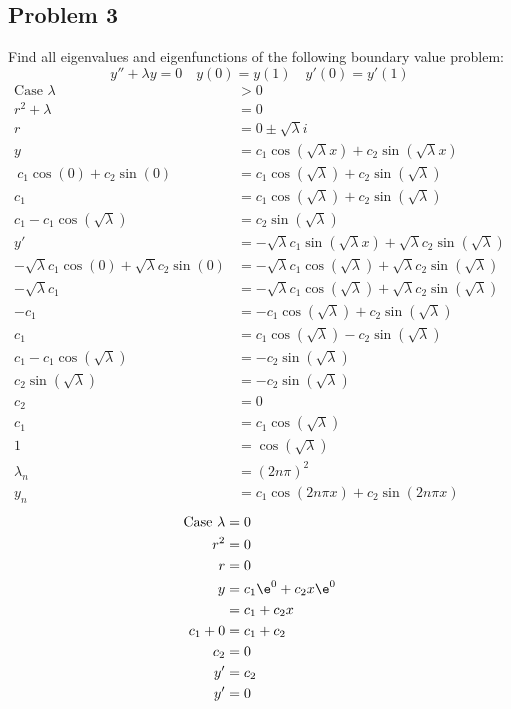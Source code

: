 \documentclass{math}
\begin{document}
\subsection*{Problem 3}
Find all eigenvalues and eigenfunctions of the following boundary value problem:
\[ y''+\lambda y = 0 \quad y(0) = y(1) \quad y'(0) = y'(1) \]
\begin{align*}
  \text{Case }\lambda &> 0 \\
  r^2+\lambda &= 0 \\
  r &= 0\pm\sqrt{\lambda}i \\
  y &= c_1\cos(\sqrt{\lambda}x)+c_2\sin(\sqrt{\lambda}x) \\\
  c_1\cos(0)+c_2\sin(0) &= c_1\cos(\sqrt{\lambda})+c_2\sin(\sqrt{\lambda}) \\
  c_1 &= c_1\cos(\sqrt{\lambda})+c_2\sin(\sqrt{\lambda}) \\
  c_1-c_1\cos(\sqrt{\lambda}) &= c_2\sin(\sqrt{\lambda}) \\
  y' &= -\sqrt{\lambda}c_1\sin(\sqrt{\lambda}x)+
    \sqrt{\lambda}c_2\sin(\sqrt{\lambda}) \\
  -\sqrt{\lambda}c_1\cos(0)+\sqrt{\lambda}c_2\sin(0) &=
    -\sqrt{\lambda}c_1\cos(\sqrt{\lambda})+
    \sqrt{\lambda}c_2\sin(\sqrt{\lambda}) \\
  -\sqrt{\lambda}c_1 &= -\sqrt{\lambda}c_1\cos(\sqrt{\lambda})+
    \sqrt{\lambda}c_2\sin(\sqrt{\lambda}) \\
  -c_1 &= -c_1\cos(\sqrt{\lambda})+c_2\sin(\sqrt{\lambda}) \\
  c_1 &= c_1\cos(\sqrt{\lambda})-c_2\sin(\sqrt{\lambda}) \\
  c_1-c_1\cos(\sqrt{\lambda}) &= -c_2\sin(\sqrt{\lambda}) \\
  c_2\sin(\sqrt{\lambda}) &= -c_2\sin(\sqrt{\lambda}) \\
  c_2 &= 0 \\
  c_1 &= c_1\cos(\sqrt{\lambda}) \\
  1 &= \cos(\sqrt{\lambda}) \\
  \lambda_n &= (2n\pi)^2 \\
  y_n &= c_1\cos(2n\pi x)+c_2\sin(2n\pi x)
\end{align*}
\begin{align*}
  \text{Case }\lambda &= 0 \\
  r^2 &= 0 \\
  r &= 0 \\
  y &= c_1\e^{0}+c_2x\e^{0} \\
  &= c_1+c_2x \\
  c_1+0 &= c_1+c_2 \\
  c_2 &= 0 \\
  y' &= c_2 \\
  y' &= 0
\end{align*}
\end{document}
